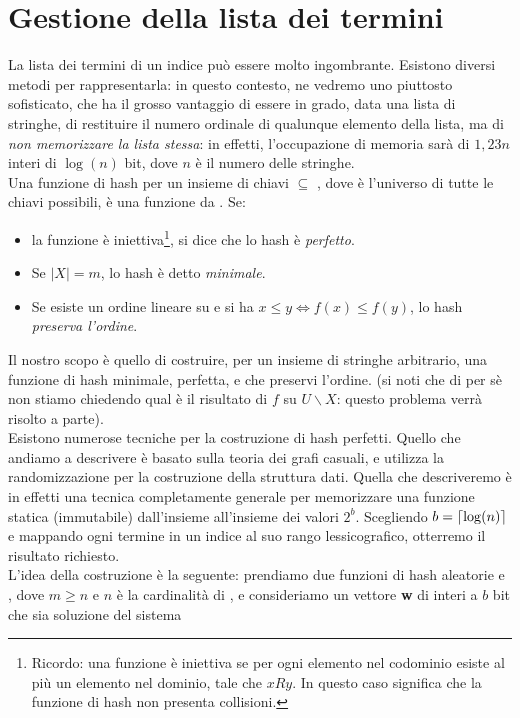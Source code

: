 \section{Gestione della lista dei termini}
La lista dei termini di un indice può essere molto ingombrante. Esistono diversi metodi per rappresentarla: in questo contesto, ne vedremo uno piuttosto sofisticato, che ha il grosso vantaggio di essere in grado, data una lista di stringhe, di restituire il numero ordinale di qualunque elemento della lista, ma di \textit{non memorizzare la lista stessa}: in effetti, l'occupazione di memoria sarà di $1,23n$ interi di $\log(n)$ bit, dove $n$ è il numero delle stringhe.\\
Una funzione di hash per un insieme di chiavi  $\subseteq$ , dove  è l'universo di tutte le chiavi possibili, è una funzione da . Se:
\begin{itemize}
    \item la funzione è iniettiva\footnote{Ricordo: una funzione è iniettiva se per ogni elemento nel codominio esiste al più un elemento nel dominio, tale che $x R y$. In questo caso significa che la funzione di hash non presenta collisioni.}, si dice che lo hash è \textit{perfetto}.
    \item Se $|X| = m$, lo hash è detto \textit{minimale}.
    \item Se esiste un ordine lineare su  e si ha $x \leq y \iff f(x) \leq f(y)$, lo hash \textit{preserva l'ordine}.  
\end{itemize}
Il nostro scopo è quello di costruire, per un insieme di stringhe arbitrario, una funzione di hash minimale, perfetta, e che preservi l'ordine. (si noti che di per sè non stiamo chiedendo qual è il risultato di $f$ su $U \smallsetminus X$: questo problema verrà risolto a parte).\\
Esistono numerose tecniche per la costruzione di hash perfetti. %
Quello che andiamo a descrivere è basato sulla teoria dei grafi casuali, e utilizza la randomizzazione per la costruzione della struttura dati. Quella che descriveremo è in effetti una tecnica completamente generale per memorizzare una funzione statica (immutabile)  dall'insieme  all'insieme dei valori $2^b$. Scegliendo $b = \left\lceil \log(n) \right\rceil$ e mappando ogni termine in un indice al suo rango lessicografico, otterremo il risultato richiesto.\\
L'idea della costruzione è la seguente: prendiamo due funzioni di hash aleatorie  e , dove $m \geq n$ e $n$ è la cardinalità di , e consideriamo un vettore \textbf{w} di interi a $b$ bit che sia soluzione del sistema
